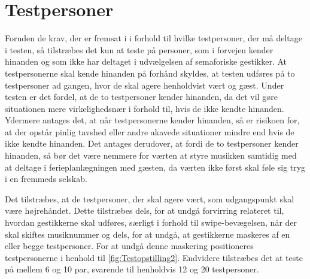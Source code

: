 \section{Testpersoner}
\label{TestpersonerSocialAccept}
%
Foruden de krav, der er fremsat i  i forhold til hvilke testpersoner, der må deltage i testen, så tilstræbes det kun at teste på personer, som i forvejen kender hinanden og som ikke har deltaget i udvælgelsen af semaforiske gestikker. At testpersonerne skal kende hinanden på forhånd skyldes, at testen udføres på to testpersoner ad gangen, hvor de skal agere henholdvist vært og gæst. Under testen er det fordel, at de to testpersoner kender hinanden, da det vil gøre situationen mere virkelighedsnær i forhold til, hvis de ikke kendte hinanden. Ydermere antages det, at når testpersonerne kender hinanden, så er risikoen for, at der opstår pinlig tavshed eller andre akavede situationer mindre end hvis de ikke kendte hinanden. Det antages derudover, at fordi de to testpersoner kender hinanden, så bør det være nemmere for værten at styre musikken samtidig med at deltage i ferieplanlægningen med gæsten, da værten ikke først skal føle sig tryg i en fremmeds selskab. 

Det tilstræbes, at de testpersoner, der skal agere vært, som udgangspunkt skal være højrehåndet. Dette tilstræbes dels, for at undgå forvirring relateret til, hvordan gestikkerne skal udføres, særligt i forhold til swipe-bevægelsen, når der skal skiftes musiknummer og dels, for at undgå, at gestikkerne maskeres af en eller begge testpersoner. For at undgå denne maskering positioneres testpersonerne i henhold til \autoref{fig:Testopstilling2}. Endvidere tilstræbes det at teste på mellem 6 og 10 par, svarende til henholdvis 12 og 20 testpersoner. 